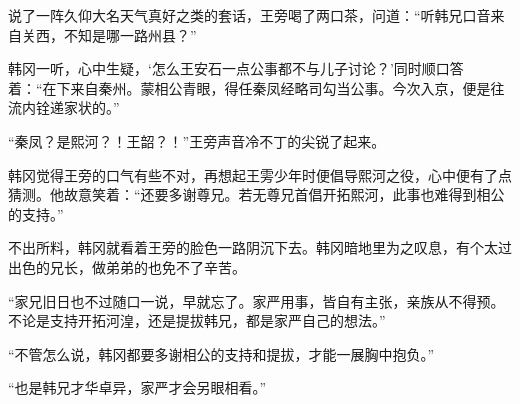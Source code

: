 说了一阵久仰大名天气真好之类的套话，王旁喝了两口茶，问道：“听韩兄口音来自关西，不知是哪一路州县？”

韩冈一听，心中生疑，‘怎么王安石一点公事都不与儿子讨论？’同时顺口答着：“在下来自秦州。蒙相公青眼，得任秦凤经略司勾当公事。今次入京，便是往流内铨递家状的。”

“秦凤？是熙河？！王韶？！”王旁声音冷不丁的尖锐了起来。

韩冈觉得王旁的口气有些不对，再想起王雱少年时便倡导熙河之役，心中便有了点猜测。他故意笑着：“还要多谢尊兄。若无尊兄首倡开拓熙河，此事也难得到相公的支持。”

不出所料，韩冈就看着王旁的脸色一路阴沉下去。韩冈暗地里为之叹息，有个太过出色的兄长，做弟弟的也免不了辛苦。

“家兄旧日也不过随口一说，早就忘了。家严用事，皆自有主张，亲族从不得预。不论是支持开拓河湟，还是提拔韩兄，都是家严自己的想法。”

“不管怎么说，韩冈都要多谢相公的支持和提拔，才能一展胸中抱负。”

“也是韩兄才华卓异，家严才会另眼相看。”

